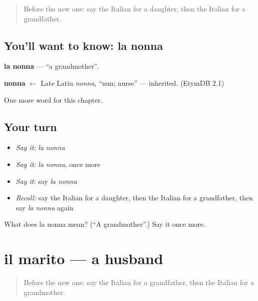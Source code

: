 \label{lesson:IT-C44-nonna}



\begin{quote}
Before the new one: say the Italian for a daughter, then the Italian for a grandfather.
\end{quote}

\subsection*{You'll want to know: la nonna}
\textbf{la nonna} — \textquotedblleft{}a grandmother\textquotedblright{}.

\begin{cousinweb}
\textbf{nonna} $\leftarrow$ Late Latin \emph{nonna}, \textquotedblleft{}nun; nurse\textquotedblright{} — inherited. (EtymDB 2.1)
\end{cousinweb}

\begin{grammarlens}[title={What you've built}]
One more word for this chapter.
\end{grammarlens}

\subsection*{Your turn}
\begin{itemize}
\raggedright
  \item \emph{Say it:} \emph{la nonna}
  \item \emph{Say it:} \emph{la nonna}, once more
  \item \emph{Say it:} say \emph{la nonna}
  \item \emph{Recall:} say the Italian for a daughter, then the Italian for a grandfather, then say \emph{la nonna} again
\end{itemize}

\begin{tcolorbox}[breakable,colback=teal!4,colframe=teal!35!black,title={Before you move on}]
What does la nonna mean? (\textquotedblleft{}A grandmother\textquotedblright{}.) Say it once more.
\end{tcolorbox}
\section[il marito]{il marito — a husband}

\label{lesson:IT-C44-marito}



\begin{quote}
Before the new one: say the Italian for a grandfather, then the Italian for a grandmother.
\end{quote}

